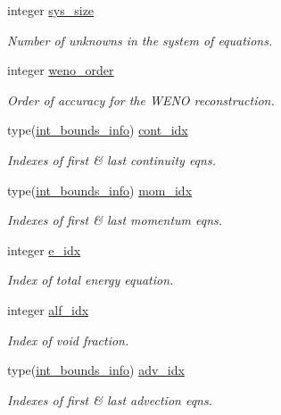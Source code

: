 \begin{DoxyCompactItemize}
integer \hyperlink{namespacem__global__parameters_a4dac2e4ead915635e0c6c33af87be01b}{sys\+\_\+size}
\begin{DoxyCompactList}\small\item\em Number of unknowns in the system of equations. \end{DoxyCompactList}\item 
integer \hyperlink{namespacem__global__parameters_ab8488205257dab4e94258eee55d0d1aa}{weno\+\_\+order}
\begin{DoxyCompactList}\small\item\em Order of accuracy for the W\+E\+NO reconstruction. \end{DoxyCompactList}\item 
type(\hyperlink{structm__derived__types_1_1int__bounds__info}{int\+\_\+bounds\+\_\+info}) \hyperlink{namespacem__global__parameters_a5d234ed722013d06fbb2d1ee5f8aab56}{cont\+\_\+idx}
\begin{DoxyCompactList}\small\item\em Indexes of first \& last continuity eqns. \end{DoxyCompactList}\item 
type(\hyperlink{structm__derived__types_1_1int__bounds__info}{int\+\_\+bounds\+\_\+info}) \hyperlink{namespacem__global__parameters_a293bc6a9ccf7a197d8a5f0cfc3988584}{mom\+\_\+idx}
\begin{DoxyCompactList}\small\item\em Indexes of first \& last momentum eqns. \end{DoxyCompactList}\item 
integer \hyperlink{namespacem__global__parameters_ac6ef72ca6aa7a22e60c864df25559892}{e\+\_\+idx}
\begin{DoxyCompactList}\small\item\em Index of total energy equation. \end{DoxyCompactList}\item 
integer \hyperlink{namespacem__global__parameters_af451fa7762c859ef20552498fa6edb16}{alf\+\_\+idx}
\begin{DoxyCompactList}\small\item\em Index of void fraction. \end{DoxyCompactList}\item 
type(\hyperlink{structm__derived__types_1_1int__bounds__info}{int\+\_\+bounds\+\_\+info}) \hyperlink{namespacem__global__parameters_ab73a1c5c3f6815695771323454db2a81}{adv\+\_\+idx}
\begin{DoxyCompactList}\small\item\em Indexes of first \& last advection eqns. \end{DoxyCompactList}\item 

\end{DoxyCompactItemize}
